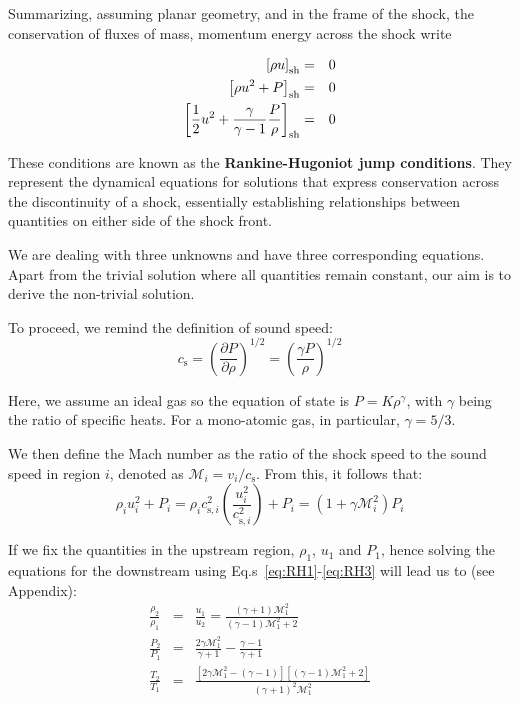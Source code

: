 Summarizing, assuming planar geometry, and in the frame of the shock, the conservation of fluxes of mass, momentum energy across the shock write
%
\begin{remark}
\begin{eqnarray}
\left[ \rho u \right]_{\rm sh} & = & 0 \label{eq:RH1} \\
\left[ \rho u^2 + P \right]_{\rm sh} & = & 0 \label{eq:RH2} \\
\left[ \frac{1}{2} u^2 +\frac{\gamma}{\gamma - 1} \frac{P}{\rho} \right]_{\rm sh} & = & 0 \label{eq:RH3}
\end{eqnarray}
\end{remark}

These conditions are known as the \textbf{Rankine-Hugoniot jump conditions}. They represent the dynamical equations for solutions that express conservation across the discontinuity of a shock, essentially establishing relationships between quantities on either side of the shock front.

We are dealing with three unknowns and have three corresponding equations. Apart from the trivial solution where all quantities remain constant, our aim is to derive the non-trivial solution.

To proceed, we remind the definition of sound speed:
%
\begin{equation}
c_{\text{s}} = \left( \frac{\partial P}{\partial \rho} \right)^{1/2} = \left(\frac{\gamma P}{\rho}\right)^{1/2}
\end{equation}

Here, we assume an ideal gas so the equation of state is \( P = K \rho^\gamma \), with \( \gamma \) being the ratio of specific heats. For a mono-atomic gas, in particular, \( \gamma = 5/3 \).

We then define the Mach number as the ratio of the shock speed to the sound speed in region \( i \), denoted as \( \mathcal{M}_i = v_i / c_{\text{s}} \). From this, it follows that:
%
\begin{equation}
\rho_i u_i^2 + P_i = \rho_i c_{\text{s}, i}^2 \left( \frac{u_i^2}{c_{\text{s},i}^2} \right) + P_i = (1 + \gamma \mathcal{M}_i^2) P_i
\end{equation}

If we fix the quantities in the upstream region,  $\rho_1$,  $u_1$ and $P_1$, hence solving the equations for the downstream using Eq.s~\ref{eq:RH1}-\ref{eq:RH3} will lead us to (see Appendix):
%
\begin{eqnarray}
\frac{\rho_2}{\rho_1} & = & \frac{u_1}{u_2}=\frac{(\gamma +1) \mathcal M_1^2}{(\gamma - 1) \mathcal M_1^2+2} \\
\frac{P_2}{P_1} & = & \frac{2\gamma \mathcal M_1^2}{\gamma +1}-\frac{\gamma -1}{\gamma +1} \\
\frac{T_2}{T_1} & = & \frac{\left[2\gamma \mathcal M_1^2 -(\gamma - 1) \right] \left[ (\gamma - 1) \mathcal M_1^2 + 2 \right]}{(\gamma + 1)^2 \mathcal M_1^2}
\end{eqnarray}

